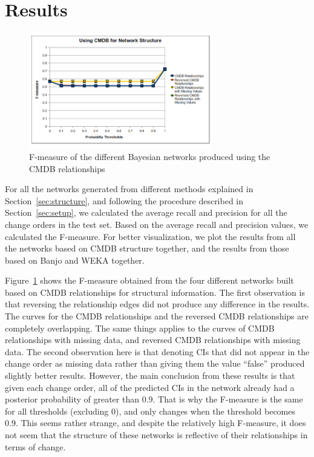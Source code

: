 \documentclass{article}
\begin{document}
\section{Results}
\label{sec:results}

\begin{figure}[!t]
\centering
\includegraphics[width=8cm]{graphics/cmdbresults.png}
\caption{F-measure of the different Bayesian networks produced using the CMDB relationships}
\label{fig:cmdbresults}
\end{figure}

For all the networks generated from different methods explained in Section~\ref{sec:structure}, and following the procedure described in
Section~\ref{sec:setup}, we calculated the average
recall and precision for all the change orders in the test set. Based on the average recall and precision values, we calculated the F-measure. For better
visualization, we plot the results from all the networks based on CMDB structure together, and the results from those based on Banjo and WEKA together.

Figure~\ref{fig:cmdbresults} shows the F-measure obtained from the four different networks built based on CMDB relationships for structural information. The
first observation is that reversing the relationship edges did not produce any difference in the results. The curves for the CMDB relationships and the reversed
CMDB relationships are completely overlapping. The same things applies to the curves of CMDB relationships with missing data, and reversed CMDB relationships
with missing data. The second observation here is that denoting CIs that did not appear in the change order as missing data rather than giving them the value
``false'' produced slightly better results. However, the main conclusion from these results is that given each change order, all of the predicted CIs in the
network already had a posterior probability of greater than 0.9. That is why the F-measure is the same for all thresholds (excluding 0), and only
changes when the threshold becomes 0.9. This seems rather strange, and despite the relatively high F-measure, it does not seem that the structure
of these networks is reflective of their relationships in terms of change.
\end{document}
